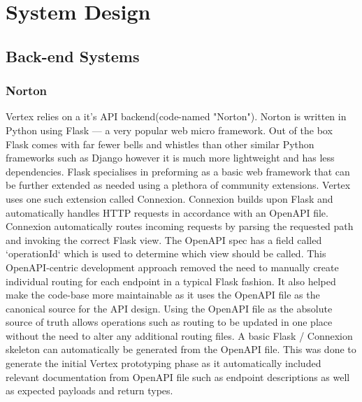 \chapter{System Design}

\section{Back-end Systems}
\subsection{Norton}
Vertex relies on a it's API backend(code-named "Norton"). Norton is written in Python using Flask — a very popular web micro framework. Out of the box Flask comes with far fewer bells and whistles than other similar Python frameworks such as Django however it is much more lightweight and has less dependencies. Flask specialises in preforming as a basic web framework that can be further extended as needed using a plethora of community extensions. Vertex uses one such extension called Connexion. Connexion builds upon Flask and automatically handles HTTP requests in accordance with an OpenAPI file. Connexion automatically routes incoming requests by parsing the requested path and invoking the correct Flask view. The OpenAPI spec has a field called `operationId` which is used to determine which view should be called. This OpenAPI-centric development approach removed the need to manually create individual routing for each endpoint in a typical Flask fashion. It also helped make the code-base more maintainable as it uses the OpenAPI file as the canonical source for the API design. Using the OpenAPI file as the absolute source of truth allows operations such as routing to be updated in one place without the need to alter any additional routing files. A basic Flask / Connexion skeleton can automatically be generated from the OpenAPI file. This was done to generate the initial Vertex prototyping phase as it automatically included relevant documentation from OpenAPI file such as endpoint descriptions as well as expected payloads and return types.


